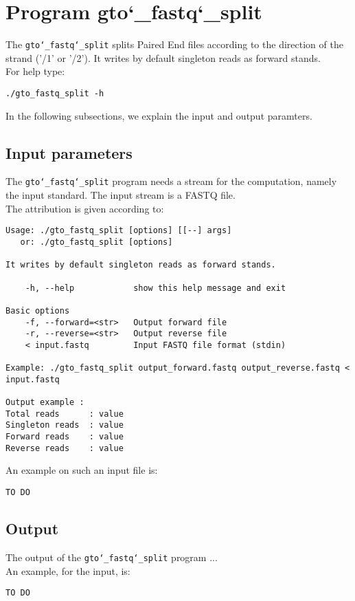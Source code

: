 \section{Program gto\char`_fastq\char`_split}
The \texttt{gto\char`_fastq\char`_split} splits Paired End files according to the direction of the strand ('/1' or '/2'). It writes by default singleton reads as forward stands. \\
For help type:
\begin{lstlisting}
./gto_fastq_split -h
\end{lstlisting}
In the following subsections, we explain the input and output paramters.

\subsection*{Input parameters}

The \texttt{gto\char`_fastq\char`_split} program needs a stream for the computation,
namely the input standard. The input stream is a FASTQ file.\\
The attribution is given according to:
\begin{lstlisting}
Usage: ./gto_fastq_split [options] [[--] args]
   or: ./gto_fastq_split [options]

It writes by default singleton reads as forward stands.

    -h, --help            show this help message and exit

Basic options
    -f, --forward=<str>   Output forward file
    -r, --reverse=<str>   Output reverse file
    < input.fastq         Input FASTQ file format (stdin)

Example: ./gto_fastq_split output_forward.fastq output_reverse.fastq < input.fastq

Output example :
Total reads      : value
Singleton reads  : value
Forward reads    : value
Reverse reads    : value
\end{lstlisting}
An example on such an input file is:
\begin{lstlisting}
TO DO
\end{lstlisting}

\subsection*{Output}
The output of the \texttt{gto\char`_fastq\char`_split} program ...\\
An example, for the input, is:
\begin{lstlisting}
TO DO
\end{lstlisting}

